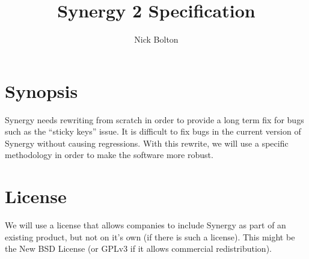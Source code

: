 \documentclass{article}
\title{Synergy 2 Specification}
\author{Nick Bolton}
\begin{document}
\maketitle
\clearpage

\section{Synopsis}

Synergy needs rewriting from scratch in order to provide a long term fix for 
bugs such as the ``sticky keys'' issue. It is difficult to fix bugs in the
current version of Synergy without causing regressions. With this rewrite, we
will use a specific methodology in order to make the software more robust.

\section{License}

We will use a license that allows companies to include Synergy as part of an 
existing product, but not on it's own (if there is such a license). This might
be the New BSD License (or GPLv3 if it allows commercial redistribution).

\clearpage

\setcounter{tocdepth}{2}
\tableofcontents
\clearpage



\clearpage


\clearpage


\clearpage


\clearpage

\appendix

\end{document}
